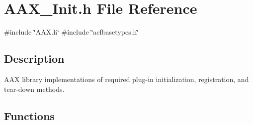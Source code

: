 \hypertarget{a00617}{}\section{A\+A\+X\+\_\+\+Init.\+h File Reference}
\label{a00617}
{\ttfamily \#include \char`\"{}A\+A\+X.\+h\char`\"{}}\newline
{\ttfamily \#include \char`\"{}acfbasetypes.\+h\char`\"{}}\newline


\subsection{Description}
A\+AX library implementations of required plug-\/in initialization, registration, and tear-\/down methods. 

\subsection*{Functions}

